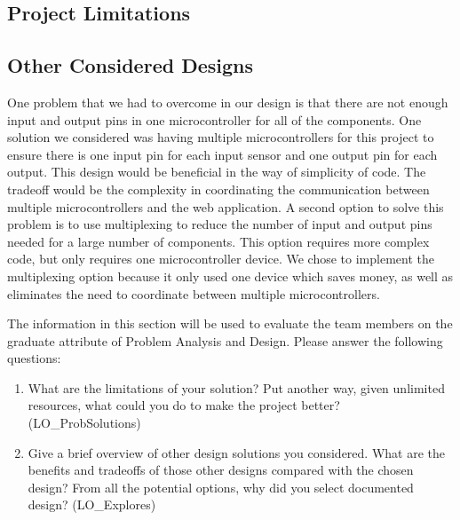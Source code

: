 \documentclass[12pt, titlepage]{article}
\begin{document}
\subsection*{Project Limitations}

\subsection*{Other Considered Designs}
One problem that we had to overcome in our design is that there are not enough input and output pins in one microcontroller for all of the components.
One solution we considered was having multiple microcontrollers for this project to ensure there is one input pin for each input sensor and one output pin for each output.
This design would be beneficial in the way of simplicity of code. The tradeoff would be the complexity in coordinating the communication between multiple microcontrollers and the 
web application. A second option to solve this problem is to use multiplexing to reduce the number of input and output pins needed for a large number of components. 
This option requires more complex code, but only requires one microcontroller device. We chose to implement the multiplexing option because it only used one device which saves money,
as well as eliminates the need to coordinate between multiple microcontrollers. 

The information in this section will be used to evaluate the team members on the
graduate attribute of Problem Analysis and Design.  Please answer the following questions:

\begin{enumerate}
  \item What are the limitations of your solution?  Put another way, given
  unlimited resources, what could you do to make the project better? (LO\_ProbSolutions)
  \item Give a brief overview of other design solutions you considered.  What
  are the benefits and tradeoffs of those other designs compared with the chosen
  design?  From all the potential options, why did you select documented design?
  (LO\_Explores)
\end{enumerate}
\end{document}
